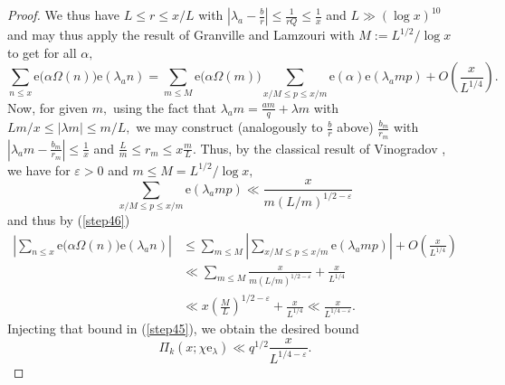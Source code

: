 \documentclass{article}
\newcommand{\e}{\mathrm{e}}
\newcommand{\eps}{\varepsilon}
\begin{document}
\begin{proof}
    We thus have $L \le r\le x/L$ with $\left|\lambda_a - \frac{b}{r}\right| \le \frac{1}{rQ} \le \frac{1}{x}$ and $L \gg (\log x)^{10}$ and may thus apply the result of Granville and Lamzouri \cite[Theorem 1.1]{exponential} with $M := L^{1/2}/\log x$ to get for all $\alpha,$
    \begin{equation}\label{step46}
        \sum_{n\le x} \e\big(\alpha\Omega(n)\big) \e(\lambda_a n) = \sum_{m\le M} \e\big(\alpha\Omega(m)\big) \sum_{x/M \le p \le x/m} \e(\alpha) \e(\lambda_a mp) + O\left(\frac{x}{L^{1/4}}\right).
    \end{equation}
    Now, for given $m,$ using the fact that $\lambda_a m = \frac{am}{q} + \lambda m$ with $Lm/x \le |\lambda m| \le m/L,$ we may construct (analogously to $\frac{b}{r}$ above) $\frac{b_m}{r_m}$ with $\left|\lambda_a m - \frac{b_m}{r_m}\right| \le \frac{1}{x}$ and $\frac{L}{m}\le r_m \le x\frac{m}{L}.$
    Thus, by the classical result of Vinogradov \cite[§9]{vinogradov}, we have for $\eps > 0$ and $m\le M = L^{1/2}/\log x,$ $$\sum_{x/M \le p \le x/m} \e(\lambda_a mp) \ll \frac{x}{m (L/m)^{1/2-\eps}}$$
    and thus by (\ref{step46})
    \begin{align*}
        \left|\sum_{n\le x} \e\big(\alpha\Omega(n)\big) \e(\lambda_a n)\right| &\le \sum_{m\le M} \left|\sum_{x/M \le p \le x/m} \e(\lambda_a mp)\right| +  O\left(\frac{x}{L^{1/4}}\right)
        \\&\ll \sum_{m\le M} \frac{x}{m (L/m)^{1/2-\eps}} +  \frac{x}{L^{1/4}}
        \\&\ll x\left(\frac{M}{L}\right)^{1/2-\eps} + \frac{x}{L^{1/4}} \ll \frac{x}{L^{1/4-\eps}}.
    \end{align*}
    Injecting that bound in (\ref{step45}), we obtain the desired bound
    $$\Pi_k(x;\chi\e_\lambda) \ll q^{1/2}\frac{x}{L^{1/4-\eps}}.$$
\end{proof}
\end{document}
